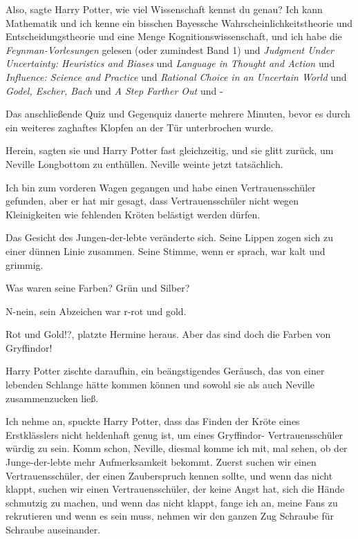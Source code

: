 \glqq{}Also\grqq{}, sagte Harry Potter, \glqq{}wie viel Wissenschaft kennst du
genau? Ich kann Mathematik und ich kenne ein bisschen Bayessche
Wahrscheinlichkeitstheorie und Entscheidungstheorie und eine Menge
Kognitionswissenschaft, und ich habe die \emph{Feynman-Vorlesungen} gelesen
(oder zumindest Band 1) und \emph{Judgment Under Uncertainty: Heuristics and
Biases} und \emph{Language in Thought and Action} und \emph{Influence: Science
and Practice} und \emph{Rational Choice in an Uncertain World} und \emph{Godel,
Escher, Bach} und \emph{A Step Farther Out} und -\grqq{}

Das anschließende Quiz und Gegenquiz dauerte mehrere Minuten, bevor es durch ein
weiteres zaghaftes Klopfen an der Tür unterbrochen wurde.

\glqq{}Herein\grqq{}, sagten sie und Harry Potter fast gleichzeitig, und sie
glitt zurück, um Neville Longbottom zu enthüllen. Neville weinte jetzt
tatsächlich.

\glqq{}Ich bin zum vorderen Wagen gegangen und habe einen Vertrauensschüler
gefunden, aber er hat mir gesagt, dass Vertrauensschüler nicht wegen
Kleinigkeiten wie fehlenden Kröten belästigt werden dürfen.\grqq{}

Das Gesicht des Jungen-der-lebte veränderte sich. Seine Lippen zogen sich zu
einer dünnen Linie zusammen. Seine Stimme, wenn er sprach, war kalt und grimmig.

\glqq{}Was waren seine Farben? Grün und Silber?\grqq{}

\glqq{}N-nein, sein Abzeichen war r-rot und gold.\grqq{}

\glqq{}Rot und Gold!?\grqq{}, platzte Hermine heraus. \glqq{}Aber das sind doch
die Farben von Gryffindor!\grqq{}

Harry Potter zischte daraufhin, ein beängstigendes Geräusch, das von einer
lebenden Schlange hätte kommen können und sowohl sie als auch Neville
zusammenzucken ließ.

\glqq{}Ich nehme an\grqq{}, spuckte Harry Potter, \glqq{}dass das Finden der Kröte
eines Erstklässlers nicht heldenhaft genug ist, um eines Gryffindor-
Vertrauensschüler würdig zu sein. Komm schon, Neville, diesmal komme ich mit,
mal sehen, ob der Junge-der-lebte mehr Aufmerksamkeit bekommt. Zuerst suchen wir
einen Vertrauensschüler, der einen Zauberspruch kennen sollte, und wenn das
nicht klappt, suchen wir einen Vertrauensschüler, der keine Angst hat, sich die
Hände schmutzig zu machen, und wenn das nicht klappt, fange ich an, meine Fans
zu rekrutieren und wenn es sein muss, nehmen wir den ganzen Zug Schraube für
Schraube auseinander.\grqq{}

